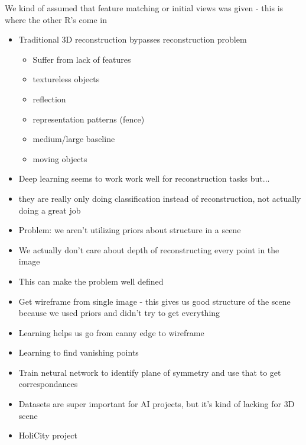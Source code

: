 \documentclass{report}
\begin{document}
    We kind of assumed that feature matching or initial views was given - this is where the other R's come in

    \begin{itemize}
        \item Traditional 3D reconstruction bypasses reconstruction problem
        \begin{itemize}
            \item Suffer from lack of features
            \item textureless objects
            \item reflection
            \item representation patterns (fence)
            \item medium/large baseline
            \item moving objects
        \end{itemize}
        \item Deep learning seems to work work well for reconstruction tasks but...
        \item they are really only doing classification instead of reconstruction, not actually doing a great job
        \item Problem: we aren't utilizing priors about structure in a scene
        \item We actually don't care about depth of reconstructing every point in the image
        \item This can make the problem well defined
        \item Get wireframe from single image - this gives us good structure of the scene because we used priors and didn't try to get everything
        \item Learning helps us go from canny edge to wireframe
        \item Learning to find vanishing points
        \item Train netural network to identify plane of symmetry and use that to get correspondances
        \item Datasets are super important for AI projects, but it's kind of lacking for 3D scene
        \item HoliCity project
    \end{itemize}
\end{document}
